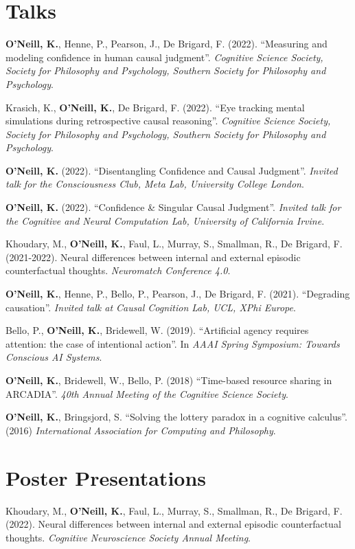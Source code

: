\section{Talks}
\textbf{O'Neill, K.}, Henne, P., Pearson, J., De Brigard,
F. (2022). ``Measuring and modeling confidence in human causal
judgment''. \emph{Cognitive Science Society, Society for Philosophy
and Psychology, Southern Society for Philosophy and Psychology}.

Krasich, K., \textbf{O'Neill, K.}, De Brigard, F. (2022). ``Eye
tracking mental simulations during retrospective causal
reasoning''. \emph{Cognitive Science Society, Society for Philosophy
and Psychology, Southern Society for Philosophy and Psychology}.

\textbf{O'Neill, K.} (2022). ``Disentangling Confidence and Causal
Judgment''. \emph{Invited talk for the Consciousness Club, Meta Lab,
University College London}.

\textbf{O'Neill, K.} (2022). ``Confidence \& Singular Causal
Judgment''. \emph{Invited talk for the Cognitive and Neural
Computation Lab, University of California Irvine}.

Khoudary, M., \textbf{O’Neill, K.}, Faul, L., Murray, S., Smallman,
R., De Brigard, F. (2021-2022). Neural differences between internal
and external episodic counterfactual thoughts. \emph{Neuromatch
Conference 4.0}.

\textbf{O'Neill, K.}, Henne, P., Bello, P., Pearson, J., De Brigard,
F. (2021). ``Degrading causation''. \emph{Invited talk at Causal
Cognition Lab, UCL, XPhi Europe}.

Bello, P., \textbf{O'Neill, K.}, Bridewell, W. (2019). ``Artificial
agency requires attention: the case of intentional action''. In
\emph{AAAI Spring Symposium: Towards Conscious AI Systems}.

\textbf{O'Neill, K.}, Bridewell, W., Bello, P. (2018) ``Time-based
resource sharing in ARCADIA''. \emph{40th Annual Meeting of the
Cognitive Science Society}.

\textbf{O’Neill, K.}, Bringsjord, S. ``Solving the lottery paradox in
a cognitive calculus''. (2016) \emph{International Association for
Computing and Philosophy}.

\line\section{Poster Presentations}

Khoudary, M., \textbf{O’Neill, K.}, Faul, L., Murray, S., Smallman,
R., De Brigard, F. (2022). Neural differences between internal and
external episodic counterfactual thoughts. \emph{Cognitive
Neuroscience Society Annual Meeting}.

